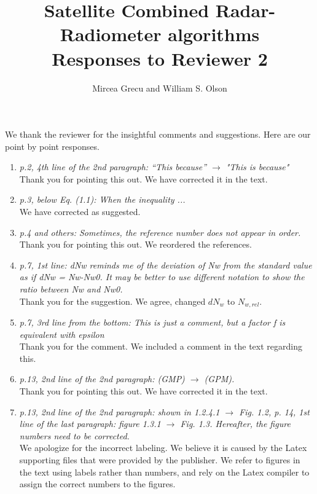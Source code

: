\documentclass[12pt]{article}
\author{Mircea Grecu and William S. Olson}
\title{Satellite Combined Radar-Radiometer
algorithms\\
Responses to Reviewer 2}
\date{}
\begin{document}
\maketitle


We thank the reviewer for the insightful comments and suggestions. 
Here are our point by point responses.

\begin{enumerate}
    \item{\textit{p.2, 4th line of the 2nd paragraph: “This because” $\rightarrow$ "This is because"}\\
    Thank you for pointing this out.  We have corrected it in the text.
    }
    \item{\textit{p.3, below Eq. (1.1): When the inequality ...}\\
    We have corrected as suggested.
    }
    \item{\textit{p.4 and others: Sometimes, the reference number does not appear in order.}\\
    Thank you for pointing this out.  We reordered the references.
    }
    \item{\textit {p.7, 1st line: dNw reminds me of the deviation of Nw from the standard value as if dNw = Nw-Nw0. 
    It may be better to use different notation to show the ratio between Nw and Nw0.}\\
    Thank you for the suggestion. We agree, changed $dN_w$ to $N_{w,rel}$.
    }
    \item{\textit{p.7, 3rd line from the bottom: This is just a comment, but a factor f is equivalent with epsilon}\\
    Thank you for the comment. We included a comment in the text regarding this.
    }
    \item{\textit{p.13, 2nd line of the 2nd paragraph: (GMP) $\rightarrow$ (GPM).}\\
    Thank you for pointing this out.  We have corrected it in the text.
    }
    \item{\textit{p.13, 2nd line of the 2nd paragraph: shown in 1.2.4.1 $\rightarrow$ Fig. 1.2,
    p. 14, 1st line of the last paragraph: figure 1.3.1 $\rightarrow$ Fig. 1.3. Hereafter, the figure numbers need to be corrected.}\\
    We apologize for the incorrect labeling. We believe it is caused by the Latex supporting files that were provided by the publisher. 
    We refer to figures in the text using labels rather than numbers, and rely on the Latex compiler to assign the correct numbers to the figures.
}
\end{enumerate}
\end{document}
